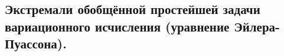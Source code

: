 \subsection{Экстремали обобщённой простейшей задачи вариационного исчисления (уравнение Эйлера-Пуассона).}